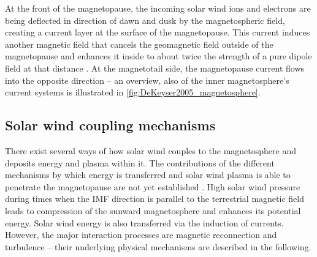 At the front of the magnetopause, the incoming solar wind ions and electrons are being deflected in direction of dawn and dusk by the magnetospheric field, creating a current layer at the surface of the magnetopause. This current induces another magnetic field that cancels the geomagnetic field outside of the magnetopause and enhances it inside to about twice the strength of a pure dipole field at that distance \citep{DeKeyser2005}. At the magnetotail side, the magnetopause current flows into the opposite direction -- an overview, also of the inner magnetosphere's current systems is illustrated in \autoref{fig:DeKeyser2005_magnetosphere}.
\begin{figure}[htb]
\end{figure}


\subsection{Solar wind coupling mechanisms}
\label{sec:solar_wind_coupling_mechanisms}
There exist several ways of how solar wind couples to the magnetosphere and deposits energy and plasma within it. The contributions of the different mechanisms by which energy is transferred and solar wind plasma is able to penetrate the magnetopause are not yet established \citep{Phan2005}. High solar wind pressure during times when the IMF direction is parallel to the terrestrial magnetic field leads to compression of the sunward magnetosphere and enhances its potential energy. Solar wind energy is also transferred via the induction of currents. However, the major interaction processes are magnetic reconnection and turbulence -- their underlying physical mechanisms are described in the following.

